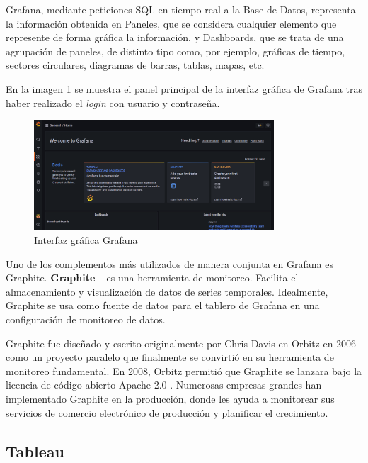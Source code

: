 \documentclass[a4paper, 12pt]{book}
\begin{document}
Grafana, mediante peticiones SQL en tiempo real a la Base de Datos, representa la
información obtenida en Paneles, que se considera cualquier elemento que represente de forma gráfica la información, y Dashboards, que se trata de una agrupación de paneles, de distinto tipo como, por ejemplo, gráficas de tiempo, sectores circulares, diagramas de barras, tablas, mapas, etc.

En la imagen \ref{figura:Grafana} se muestra  el panel principal de la interfaz gráfica de Grafana tras haber realizado el \emph{login} con usuario y contraseña.

\begin{figure}[ht]
        \centering
        \includegraphics[width=0.8\textwidth]{img/Grafana.png}
        \caption{Interfaz gráfica Grafana}
        \label{figura:Grafana}
    \end{figure}

Uno de los complementos más utilizados de manera conjunta en Grafana es Graphite.
\textbf{Graphite} ~\cite{Graphite} es una herramienta de monitoreo. Facilita el almacenamiento y visualización de datos de series temporales. Idealmente, Graphite se usa como fuente de datos para el tablero de Grafana en una configuración de monitoreo de datos.

Graphite fue diseñado y escrito originalmente por Chris Davis en Orbitz en 2006 como un proyecto paralelo que finalmente se convirtió en su herramienta de monitoreo fundamental. En 2008, Orbitz permitió que Graphite se lanzara bajo la licencia de código abierto Apache 2.0 . Numerosas empresas grandes han implementado Graphite en la producción, donde les ayuda a monitorear sus servicios de comercio electrónico de producción y planificar el crecimiento.

\subsection{Tableau}
\label{sec:tableau}
\end{document}

